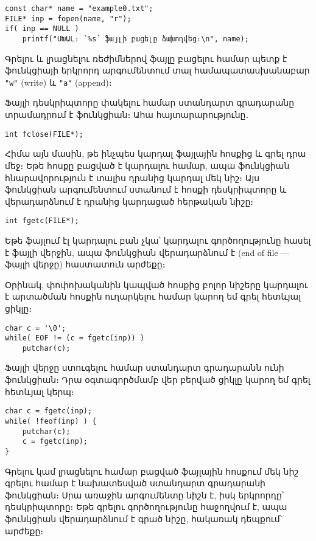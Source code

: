 \begin{Verbatim}
const char* name = "example0.txt";
FILE* inp = fopen(name, "r");
if( inp == NULL )
    printf("ՍԽԱԼ։ ՝%s՝ ֆայլի բացելը ձախողվեց։\n", name);
\end{Verbatim}

Գրելու և լրացնելու ռեժիմներով ֆայլը բացելու համար պետք է
 ֆունկցիայի երկրորդ արգումենտում տալ համապատասխանաբար
\Verb|"w"| (write) և \Verb|"a"| (append)։

Ֆայլի դեսկրիպտորը փակելու համար ստանդարտ գրադարանը տրամադրում է
 ֆունկցիան։ Ահա հայտարարությունը․

\begin{Verbatim}
int fclose(FILE*);
\end{Verbatim}

Հիմա այն մասին, թե ինչպես կարդալ ֆայլային հոսքից և գրել դրա մեջ։
Եթե հոսքը բացված է կարդալու համար, ապա  ֆունկցիան
հնարավորություն է տալիս դրանից կարդալ մեկ նիշ։ Այս ֆունկցիան
արգումենտում ստանում է հոսքի դեսկրիպտորը և վերադարձնում է դրանից
կարդացած հերթական նիշը։

\begin{Verbatim}
int fgetc(FILE*);
\end{Verbatim}

Եթե ֆայլում էլ կարդալու բան չկա՝ կարդալու գործողությունը հասել
է ֆայլի վերջին, ապա  ֆունկցիան վերադարձնում է
 (end of file --- ֆայլի վերջը) հաստատուն արժեքը։

Օրինակ,  փոփոխականին կապված հոսքից բոլոր նիշերը
կարդալու է արտածման հոսքին ուղարկելու համար կարող եմ գրել
հետևյալ ցիկլը։

\begin{Verbatim}
char c = '\0';
while( EOF != (c = fgetc(inp)) )
    putchar(c);
\end{Verbatim}

Ֆայլի վերջը ստուգելու համար ստանդարտ գրադարանն ունի
 ֆունկցիան։ Դրա օգտագործմամբ վեր բերված ցիկլը
կարող եմ գրել հետևյալ կերպ։

\begin{Verbatim}
char c = fgetc(inp);
while( !feof(inp) ) {
    putchar(c);
    c = fgetc(inp);
}
\end{Verbatim}

Գրելու կամ լրացնելու համար բացված ֆայլային հոսքում մեկ նիշ
գրելու համար է նախատեսված ստանդարտ գրադարանի 
ֆունկցիան։ Սրա առաջին արգումենտը նիշն է, իսկ երկրորդը՝
դեսկրիպտորը։ Եթե գրելու գործողությունը հաջողվում է, ապա
 ֆունկցիան վերադարձնում է գրած նիշը, հակառակ
դեպքում՝  արժեքը։

